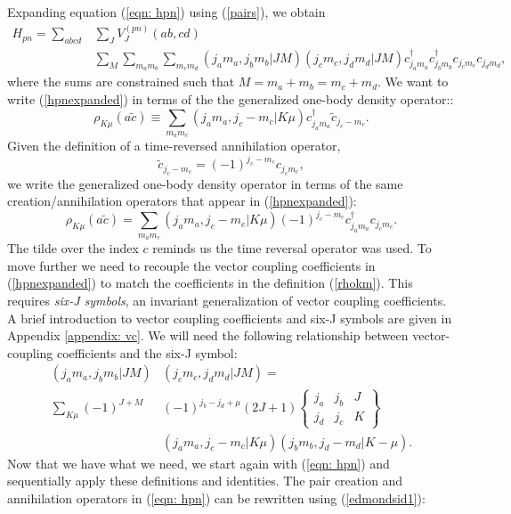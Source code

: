 Expanding equation (\ref{eqn: hpn}) using (\ref{pairs}), we obtain
\begin{equation}\begin{split}\label{hpnexpanded}
    H_{pn} = \sum_{abcd}&\sum_J V_J^{(pn)}(ab,cd) \\
    &\sum_M \sum_{m_am_b}\sum_{m_cm_d} (j_a m_a, j_b m_b | JM )
        (j_c m_c, j_d m_d | JM )c^\dagger_{j_am_a}c^\dagger_{j_bm_b}c_{j_cm_c} c_{j_dm_d},
\end{split}\end{equation}
where the sums are constrained such that $M=m_a+m_b=m_c+m_d$. We want to write (\ref{hpnexpanded})
in terms of the the generalized one-body density operator:\cite{Schuck}:
\begin{equation}
    \rho_{K\mu}(a\tilde{c}) \equiv \sum_{m_a m_c} (j_a m_a, j_c -m_c | K\mu) 
c^\dagger_{j_am_a} \tilde{c}_{j_c-m_c}.
\end{equation}
Given the definition of a time-reversed annihilation operator\cite{Edmonds},
\begin{equation} 
    \tilde{c}_{j_c-m_c} = (-1)^{j_c-m_c}c_{j_c m_c},
\end{equation}
we write the generalized one-body density operator in terms of the same creation/annihilation
operators that appear in (\ref{hpnexpanded}):
\begin{equation}\label{rhokm}
    \rho_{K\mu}(a\tilde{c}) = \sum_{m_a m_c} (j_a m_a, j_c -m_c | K\mu)
(-1)^{j_c -m_c} c^\dagger_{j_a m_a} c_{j_c m_c}.
\end{equation}
The tilde over the index $c$ reminds us the time reversal 
operator was used. To move further we need to
recouple the vector coupling coefficients in (\ref{hpnexpanded}) to match
the coefficients in the definition (\ref{rhokm}). This requires \textit{six-J symbols}\cite{Edmonds},
an invariant generalization of vector coupling coefficients. A brief introduction 
to vector coupling coefficients and six-J symbols are given in Appendix 
\ref{appendix: vc}. We will need the following relationship
between vector-coupling coefficients and the six-J symbol\cite{Edmonds}:
\begin{equation}\begin{split}\label{edmondsid1}
    (j_a m_a, j_b m_b | JM )&(j_c m_c, j_d m_d | JM )= \\ 
\sum_{K\mu} (-1)^{J+M}&(-1)^{j_b-j_d+\mu}(2J+1) \begin{Bmatrix} j_a & j_b & J \\ 
j_d & j_c & K \end{Bmatrix} \\ 
    &(j_a m_a, j_c-m_c | K\mu )(j_b m_b, j_d -m_d | K-\mu ).
\end{split}\end{equation}
Now that we have what we need, we start again with 
(\ref{eqn: hpn}) and sequentially apply these definitions and
identities. The pair creation and annihilation operators in 
(\ref{eqn: hpn}) can be rewritten using (\ref{edmondsid1}):

